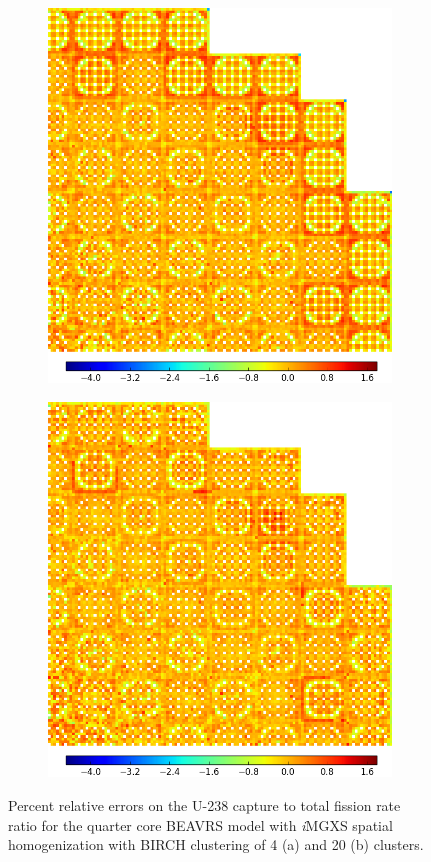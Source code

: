\begin{figure}[h!]
\centering
\begin{subfigure}{0.9\textwidth}
  \centering
  \includegraphics[width=0.65\linewidth]{figures/results/capt-to-fiss/spatial/full-core/capt-to-fiss-err-birch-4}
  \caption{}
  \label{fig:chap11-full-core-capt-to-fiss-err-birch-4}
\end{subfigure}
\begin{subfigure}{0.9\textwidth}
  \centering
\includegraphics[width=0.65\linewidth]{figures/results/capt-to-fiss/spatial/full-core/capt-to-fiss-err-birch-20}
  \caption{}
  \label{fig:chap11-full-core-capt-to-fiss-err-birch-20}
\end{subfigure}
\caption[Capture-to-fission rate error spatial distributions]{Percent relative errors on the U-238 capture to total fission rate ratio for the quarter core \ac{BEAVRS} model with \textit{i}\ac{MGXS} spatial homogenization with BIRCH clustering of 4 (a) and 20 (b) clusters.}
\label{fig:chap11-full-core-capt-to-fiss-err-b}
\end{figure}

